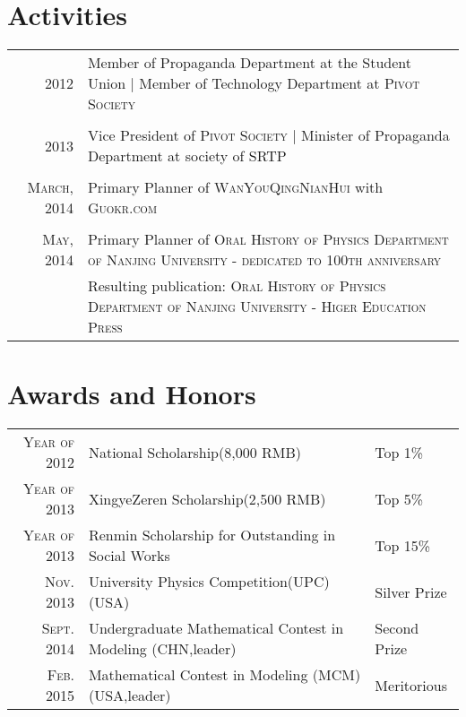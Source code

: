 \documentclass[ENG]{SealZhang}
\begin{document}
\section{Activities}
\begin{tabular}{r|p{11cm}}

\textsc{2012} & Member of Propaganda Department at the Student Union | Member of Technology Department at \textsc{Pivot Society} \\
 
 \multicolumn{2}{c}{} \\
 
\textsc{2013} &  Vice President of \textsc{Pivot Society} | Minister of Propaganda Department at society of \textsc{SRTP} \\

 \multicolumn{2}{c}{} \\
 
\textsc{March, 2014} &  Primary Planner of \textsc{WanYouQingNianHui} with \textsc{Guokr.com}\\

 \multicolumn{2}{c}{} \\
 
\textsc{May, 2014} &  Primary Planner of \textsc{Oral History of Physics Department of Nanjing University - dedicated to 100th anniversary} \\ & Resulting publication: \textsc{Oral History of Physics Department of Nanjing University} - \textsc{Higer Education Press}\\

\end{tabular}

\section{Awards and Honors}
\begin{tabular}{rll}
    \textsc{Year of 2012} & National Scholarship\footnotesize(8,000 \textsc{RMB})\normalsize & Top 1\%\\
    \textsc{Year of 2013} & XingyeZeren Scholarship\footnotesize(2,500 \textsc{RMB})\normalsize & Top 5\%\\
    \textsc{Year of 2013} & Renmin Scholarship for Outstanding in Social Works & Top 15\%\\
    \textsc{Nov. 2013} & University Physics Competition(UPC) \footnotesize (USA) \normalsize & Silver Prize \\
    \textsc{Sept. 2014} & Undergraduate Mathematical Contest in Modeling \footnotesize (CHN,leader) \normalsize & Second Prize \\
     \textsc{Feb. 2015} & Mathematical Contest in Modeling (MCM)    \footnotesize (USA,leader) \normalsize &  Meritorious\\
\end{tabular}
\end{document}
